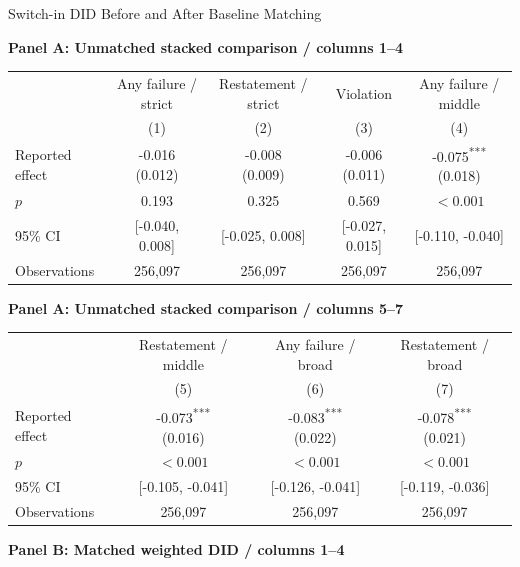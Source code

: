 \documentclass[10pt]{article}
\newcommand{\sym}[1]{\textsuperscript{#1}}
\begin{document}
\fontsize{10}{12}\selectfont
\setlength{\tabcolsep}{3pt}\renewcommand{\arraystretch}{1.15}
\begin{center}\large Switch-in DID Before and After Baseline Matching\end{center}
\medskip\textbf{Panel A: Unmatched stacked comparison / columns 1--4}\par\smallskip
\begin{tabular*}{\textwidth}{@{\extracolsep{\fill}}lcccc@{}}
\toprule
 & Any failure / strict & Restatement / strict & Violation & Any failure / middle \\
 & (1) & (2) & (3) & (4) \\
\midrule
Reported effect & \shortstack{-0.016\\(0.012)} & \shortstack{-0.008\\(0.009)} & \shortstack{-0.006\\(0.011)} & \shortstack{-0.075\sym{***}\\(0.018)} \\
$p$ & 0.193 & 0.325 & 0.569 & $<0.001$ \\
95\% CI & [-0.040, 0.008] & [-0.025, 0.008] & [-0.027, 0.015] & [-0.110, -0.040] \\
Observations & 256,097 & 256,097 & 256,097 & 256,097 \\
\bottomrule\end{tabular*}\par
\medskip\textbf{Panel A: Unmatched stacked comparison / columns 5--7}\par\smallskip
\begin{tabular*}{\textwidth}{@{\extracolsep{\fill}}lccc@{}}
\toprule
 & Restatement / middle & Any failure / broad & Restatement / broad \\
 & (5) & (6) & (7) \\
\midrule
Reported effect & \shortstack{-0.073\sym{***}\\(0.016)} & \shortstack{-0.083\sym{***}\\(0.022)} & \shortstack{-0.078\sym{***}\\(0.021)} \\
$p$ & $<0.001$ & $<0.001$ & $<0.001$ \\
95\% CI & [-0.105, -0.041] & [-0.126, -0.041] & [-0.119, -0.036] \\
Observations & 256,097 & 256,097 & 256,097 \\
\bottomrule\end{tabular*}\par
\medskip\textbf{Panel B: Matched weighted DID / columns 1--4}\par\smallskip
\end{document}
